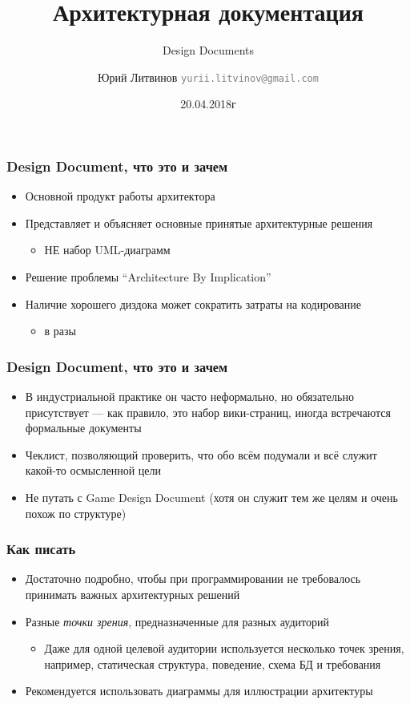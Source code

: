 \documentclass[xetex,mathserif,serif]{beamer}
\title{Архитектурная документация}
\subtitle{Design Documents}
\author[Юрий Литвинов]{Юрий Литвинов \newline \textcolor{gray}{\small\texttt{yurii.litvinov@gmail.com}}}
\date{20.04.2018г}
\begin{document}
	
	\frame{\titlepage}

	\begin{frame}
		\frametitle{Design Document, что это и зачем}
		\begin{itemize}
			\item Основной продукт работы архитектора
			\item Представляет и объясняет основные принятые архитектурные решения
			\begin{itemize}
				\item НЕ набор UML-диаграмм
			\end{itemize}
			\item Решение проблемы ``Architecture By Implication''
			\item Наличие хорошего диздока может сократить затраты на кодирование 
			\begin{itemize}
				\item в разы
			\end{itemize}
		\end{itemize}
	\end{frame}

	\begin{frame}
		\frametitle{Design Document, что это и зачем}
		\begin{itemize}
			\item В индустриальной практике он часто неформально, но обязательно присутствует --- как правило, это набор вики-страниц, иногда встречаются формальные документы
			\item Чеклист, позволяющий проверить, что обо всём подумали и всё служит какой-то осмысленной цели
			\item Не путать с Game Design Document (хотя он служит тем же целям и очень похож по структуре)
		\end{itemize}
	\end{frame}

	\begin{frame}
		\frametitle{Как писать}
		\begin{itemize}
			\item Достаточно подробно, чтобы при программировании не требовалось принимать важных архитектурных решений
			\item Разные \textit{точки зрения}, предназначенные для разных аудиторий
			\begin{itemize}
				\item Даже для одной целевой аудитории используется несколько точек зрения, например, статическая структура, поведение, схема БД и требования
			\end{itemize}
			\item Рекомендуется использовать диаграммы для иллюстрации архитектуры
		\end{itemize}
	\end{frame}
\end{document}
